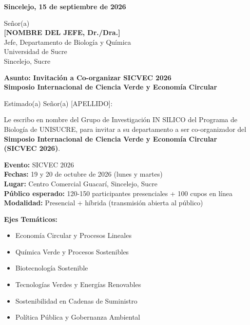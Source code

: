 \documentclass[12pt,a4paper]{article}
\begin{document}
\vspace{1cm}

\noindent
\textbf{Sincelejo, 15 de septiembre de 2026}

\vspace{1.5cm}

\noindent
Señor(a)\\
\textbf{[NOMBRE DEL JEFE, Dr./Dra.]}\\
Jefe, Departamento de Biología y Química\\
Universidad de Sucre\\
Sincelejo, Sucre

\vspace{1.5cm}

\noindent
\textbf{\large Asunto: Invitación a Co-organizar SICVEC 2026}\\
\textbf{\large Simposio Internacional de Ciencia Verde y Economía Circular}

\vspace{1.5cm}

Estimado(a) Señor(a) [APELLIDO]:

\vspace{0.8cm}

Le escribo en nombre del Grupo de Investigación IN SILICO del Programa de Biología de UNISUCRE, para invitar a su departamento a ser co-organizador del \textbf{Simposio Internacional de Ciencia Verde y Economía Circular (SICVEC 2026)}.

\vspace{0.8cm}

\textbf{Evento:} SICVEC 2026\\
\textbf{Fechas:} 19 y 20 de octubre de 2026 (lunes y martes)\\
\textbf{Lugar:} Centro Comercial Guacarí, Sincelejo, Sucre\\
\textbf{Público esperado:} 120-150 participantes presenciales + 100 cupos en línea\\
\textbf{Modalidad:} Presencial + híbrida (transmisión abierta al público)

\vspace{1cm}

\textbf{Ejes Temáticos:}
\begin{itemize}
  \item Economía Circular y Procesos Lineales
  \item Química Verde y Procesos Sostenibles
  \item Biotecnología Sostenible
  \item Tecnologías Verdes y Energías Renovables
  \item Sostenibilidad en Cadenas de Suministro
  \item Política Pública y Gobernanza Ambiental
\end{itemize}
\end{document}
